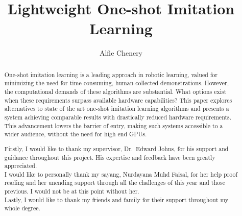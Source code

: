 \documentclass[a4paper, twoside, 12pt]{report}
\title{Lightweight One-shot Imitation Learning}
\author{Alfie Chenery}
\begin{document}


\begin{abstract}
One-shot imitation learning is a leading approach in robotic learning, valued for minimizing the need for time consuming, human-collected demonstrations. However, the computational demands of these algorithms are substantial. What options exist when these requirements surpass available hardware capabilities? This paper explores alternatives to state of the art one-shot imitation learning algorithms and presents a system achieving comparable results with drastically reduced hardware requirements. This advancement lowers the barrier of entry, making such systems accessible to a wider audience, without the need for high end GPUs.

\end{abstract}

\renewcommand{\abstractname}{Acknowledgements}
\begin{abstract}
Firstly, I would like to thank my supervisor, Dr.~Edward Johns, for his support and guidance throughout this project. His expertise and feedback have been greatly appreciated.
\\

I would like to personally thank my sayang, Nurdayana Muhd Faisal, for her help proof reading and her unending support through all the challenges of this year and those previous. I would not be at this point without her.
\\

Lastly, I would like to thank my friends and family for their support throughout my whole degree. 
\end{abstract}

\tableofcontents











\end{document}
